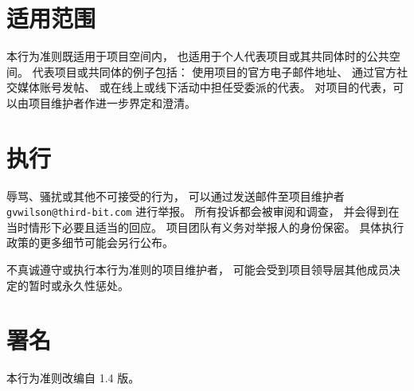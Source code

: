 \section*{适用范围}

本行为准则既适用于项目空间内，
也适用于个人代表项目或其共同体时的公共空间。
代表项目或共同体的例子包括：
使用项目的官方电子邮件地址、
通过官方社交媒体账号发帖、
或在线上或线下活动中担任受委派的代表。
对项目的代表，可以由项目维护者作进一步界定和澄清。

\section*{执行}

辱骂、骚扰或其他不可接受的行为，
可以通过发送邮件至项目维护者 \texttt{gvwilson@third-bit.com} 进行举报。
所有投诉都会被审阅和调查，
并会得到在当时情形下必要且适当的回应。
项目团队有义务对举报人的身份保密。
具体执行政策的更多细节可能会另行公布。

不真诚遵守或执行本行为准则的项目维护者，
可能会受到项目领导层其他成员决定的暂时或永久性惩处。

\section*{署名}

本行为准则改编自
 1.4 版。
